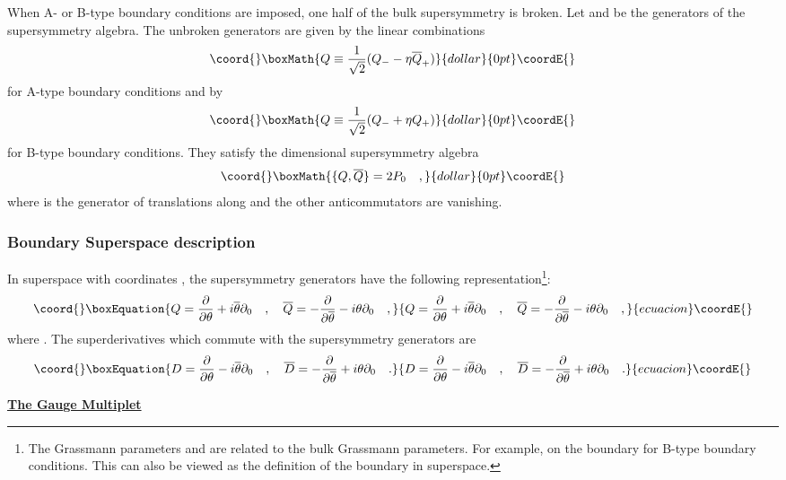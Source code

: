 \documentclass[a4paper,12pt]{article}
\begin{document}
When A- or B-type boundary conditions are imposed, one half
of the bulk \coordHE{} supersymmetry is broken. Let \coordHE{} and
\coordHE{} be the generators of the \coordHE{} supersymmetry
algebra. The unbroken generators are given by the linear combinations
$$\coord{}\boxMath{ Q \equiv {1\over\sqrt2} (Q_- - \eta \overline{Q}_+) }{dollar}{0pt}\coordE{}$$  for A-type
boundary conditions and by $$\coord{}\boxMath{Q \equiv {1\over\sqrt2} (Q_- + \eta Q_+)}{dollar}{0pt}\coordE{}$$ 
for B-type boundary conditions. They
satisfy the \coordHE{} dimensional supersymmetry algebra
$$\coord{}\boxMath{
\{Q,\overline{Q}\} = 2 P_0 \quad,
}{dollar}{0pt}\coordE{}$$
where \coordHE{} is the generator of translations along \coordHE{} and the
other anticommutators are vanishing.  

\subsubsection{Boundary Superspace description}

In superspace with coordinates \coordHE{},
the supersymmetry generators have the following
representation\footnote{The Grassmann parameters \myHighlight{$\theta$}\coordHE{} and
\myHighlight{$\overline{\theta}$}\coordHE{} are related to the bulk Grassmann parameters.
For example, \coordHE{} on the boundary
for B-type boundary conditions. 
This can also be viewed as the definition of the boundary in
superspace.}:
\begin{equation}\coord{}\boxEquation{
Q= {\partial\over{\partial\theta}} + i \overline{\theta}
\partial_0 \quad,\quad
\overline{Q}= -{\partial\over{\partial\overline{\theta}}} - i \theta
\partial_0 \quad,
}{
Q= {\partial\over{\partial\theta}} + i \overline{\theta}
\partial_0 \quad,\quad
\overline{Q}= -{\partial\over{\partial\overline{\theta}}} - i \theta
\partial_0 \quad,
}{ecuacion}\coordE{}\end{equation}
where \coordHE{}.
The superderivatives which commute with the supersymmetry generators
are
\begin{equation}\coord{}\boxEquation{
D= {\partial\over{\partial\theta}} - i \overline{\theta}
\partial_0 \quad,\quad
\overline{D}= -{\partial\over{\partial\overline{\theta}}} + i \theta
\partial_0 \quad.
}{
D= {\partial\over{\partial\theta}} - i \overline{\theta}
\partial_0 \quad,\quad
\overline{D}= -{\partial\over{\partial\overline{\theta}}} + i \theta
\partial_0 \quad.
}{ecuacion}\coordE{}\end{equation}
\bigskip
\begin{flushleft}
{\underline{\bf The Gauge Multiplet}}
\end{flushleft}
\end{document}
